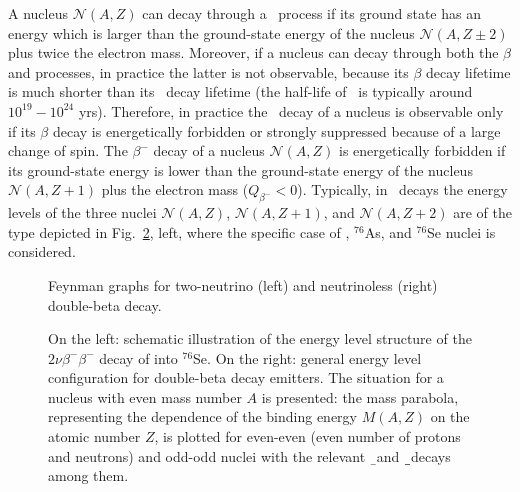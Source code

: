 A nucleus $\mathcal{N}(A,Z)$ can decay through a \nnbb\ process if its ground
state has an energy which is larger than the ground-state energy of the nucleus
$\mathcal{N}(A,Z\pm2)$ plus twice the electron mass. Moreover, if a nucleus can
decay through both the $\beta$ and \nnbb processes, in practice the latter is
not observable, because its $\beta$ decay lifetime is much shorter than its
\nnbb\ decay lifetime (the half-life of \nnbb\ is typically around
$10^{19}-10^{24}$ yrs). Therefore, in practice the \nnbb\ decay of a nucleus
is observable only if its $\beta$ decay is energetically forbidden or strongly
suppressed because of a large change of spin. The $\beta^-$ decay of a nucleus
$\mathcal{N}(A,Z)$ is energetically forbidden if its ground-state energy is
lower than the ground-state energy of the nucleus $\mathcal{N}(A,Z+1)$ plus the
electron mass ($Q_{\beta^{-}}<0$). Typically, in \nnbbm\ decays
the energy levels of the three nuclei $\mathcal{N}(A,Z)$, $\mathcal{N}(A,Z+1)$,
and $\mathcal{N}(A,Z+2)$ are of the type depicted in
Fig.~\cref{fig:nbb:gesixlevels}, left, where the specific case of \gesix,
$^{76}$As, and $^{76}$Se nuclei is considered.

\begin{figure}
  \centering%
  \caption{%
    Feynman graphs for two-neutrino (left) and neutrinoless (right) double-beta
    decay.
  }\label{fig:nbb:feydiag}
\end{figure}

\begin{figure}
  \centering
  \caption{%
    On the left: schematic illustration of the energy level structure of the
    $2\nu\beta^-\beta^-$ decay of \gesix into $^{76}$Se. On the right: general
    energy level configuration for double-beta decay emitters.  The situation
    for a nucleus with even mass number $A$ is presented: the mass parabola,
    representing the dependence of the binding energy $M(A,Z)$ on the atomic
    number $Z$, is plotted for even-even (even number of protons and neutrons)
    and odd-odd nuclei with the relevant \b\ and \b\b\ decays among them.
  }\label{fig:nbb:gesixlevels}
\end{figure}
